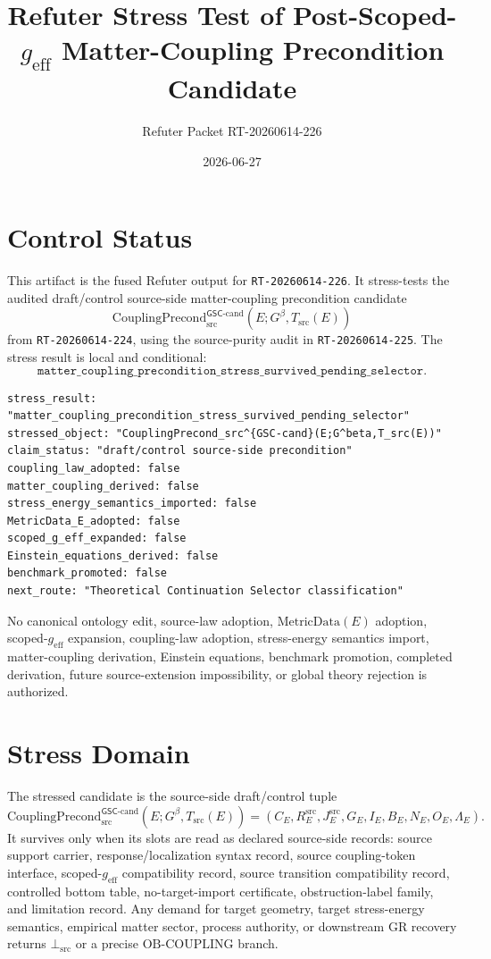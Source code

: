 \documentclass[11pt]{article}
\title{Refuter Stress Test of Post-Scoped-\texorpdfstring{$g_{\mathrm{eff}}$}{g_eff} Matter-Coupling Precondition Candidate}
\author{Refuter Packet RT-20260614-226}
\date{2026-06-27}
\newcommand{\Gbeta}{G^\beta}
\newcommand{\geff}{g_{\mathrm{eff}}}
\newcommand{\CouplingPrecond}{\mathrm{CouplingPrecond}^{\mathsf{GSC}\mbox{-}\mathrm{cand}}_{\mathrm{src}}}
\newcommand{\BottomSrc}{\bot_{\mathrm{src}}}
\newcommand{\OBCoupling}{\mathrm{OB}\mbox{-}\mathrm{COUPLING}}
\begin{document}
\maketitle

\section{Control Status}

This artifact is the fused Refuter output for \texttt{RT-20260614-226}. It
stress-tests the audited draft/control source-side matter-coupling
precondition candidate
\[
  \CouplingPrecond(E;\Gbeta,T_{\mathrm{src}}(E))
\]
from \texttt{RT-20260614-224}, using the source-purity audit in
\texttt{RT-20260614-225}. The stress result is local and conditional:
\[
  \texttt{matter\_coupling\_precondition\_stress\_survived\_pending\_selector}.
\]

\begin{verbatim}
stress_result: "matter_coupling_precondition_stress_survived_pending_selector"
stressed_object: "CouplingPrecond_src^{GSC-cand}(E;G^beta,T_src(E))"
claim_status: "draft/control source-side precondition"
coupling_law_adopted: false
matter_coupling_derived: false
stress_energy_semantics_imported: false
MetricData_E_adopted: false
scoped_g_eff_expanded: false
Einstein_equations_derived: false
benchmark_promoted: false
next_route: "Theoretical Continuation Selector classification"
\end{verbatim}

No canonical ontology edit, source-law adoption, \(\mathrm{MetricData}(E)\)
adoption, scoped-\(\geff\) expansion, coupling-law adoption, stress-energy
semantics import, matter-coupling derivation, Einstein equations, benchmark
promotion, completed derivation, future source-extension impossibility, or
global theory rejection is authorized.

\section{Stress Domain}

The stressed candidate is the source-side draft/control tuple
\[
  \CouplingPrecond(E;\Gbeta,T_{\mathrm{src}}(E)) =
  (C_E,R^{\mathrm{src}}_E,J^{\mathrm{src}}_E,G_E,I_E,B_E,N_E,O_E,\Lambda_E).
\]
It survives only when its slots are read as declared source-side records:
source support carrier, response/localization syntax record, source
coupling-token interface, scoped-\(\geff\) compatibility record, source
transition compatibility record, controlled bottom table, no-target-import
certificate, obstruction-label family, and limitation record. Any demand for
target geometry, target stress-energy semantics, empirical matter sector,
process authority, or downstream GR recovery returns \(\BottomSrc\) or a
precise \(\OBCoupling\) branch.
\end{document}
